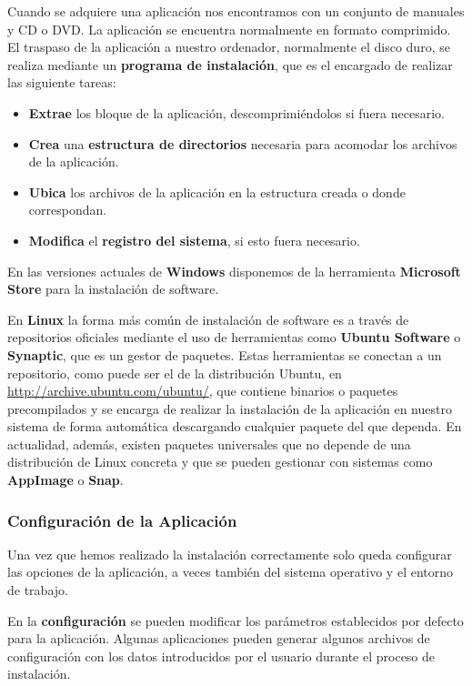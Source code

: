 Cuando se adquiere una aplicación nos encontramos con un conjunto de manuales y CD o DVD. La aplicación se encuentra normalmente en formato comprimido. El traspaso de la aplicación a nuestro ordenador, normalmente el disco duro, se realiza mediante un \textbf{programa de instalación}, que es el encargado de realizar las siguiente tareas:

\begin{itemize}
    \item \textbf{Extrae} los bloque de la aplicación, descomprimiéndolos si fuera necesario.
    \item \textbf{Crea} una \textbf{estructura de directorios} necesaria para acomodar los archivos de la aplicación.
    \item \textbf{Ubica} los archivos de la aplicación en la estructura creada o donde correspondan.
    \item \textbf{Modifica} el \textbf{registro del sistema}, si esto fuera necesario.
\end{itemize}

En las versiones actuales de \textbf{Windows} disponemos de la herramienta \textbf{Microsoft Store} para la instalación de software.

En \textbf{Linux} la forma más común de instalación de software es a través de repositorios oficiales mediante el uso de herramientas como \textbf{Ubuntu Software} o \textbf{Synaptic}, que es un gestor de paquetes. Estas herramientas se conectan a un repositorio, como puede ser el de la distribución Ubuntu, en
\url{http://archive.ubuntu.com/ubuntu/}, que contiene binarios o paquetes precompilados y se encarga de realizar la instalación de la aplicación en nuestro sistema de forma automática descargando cualquier paquete del que dependa. En actualidad, además, existen paquetes universales que no depende de una distribución de Linux concreta y que se pueden gestionar con sistemas como \textbf{AppImage} o \textbf{Snap}.

\subsubsection{Configuración de la Aplicación}
Una vez que hemos realizado la instalación correctamente solo queda configurar las opciones de la aplicación, a veces también del sistema operativo y el entorno de trabajo.

En la \textbf{configuración} se pueden modificar los parámetros establecidos por defecto para la aplicación. Algunas aplicaciones pueden generar algunos archivos de configuración con los datos introducidos por el usuario durante el proceso de instalación.


